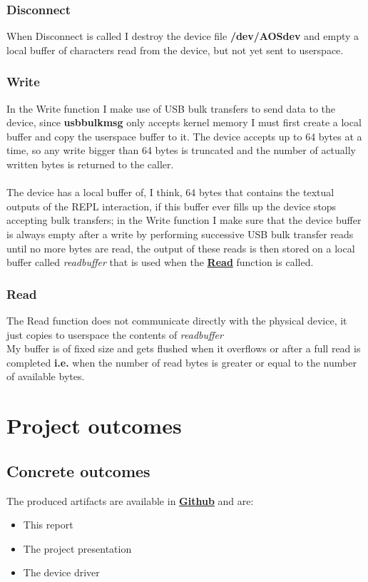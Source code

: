 \documentclass[10pt,a4]{article}
\begin{document}
\subsubsection{Disconnect}
When Disconnect is called I destroy the device file \textbf{/dev/AOSdev} and empty a local buffer of characters read from the device, but not yet sent to userspace.
\subsubsection{Write}
In the Write function I make use of USB bulk transfers to send data to the device, since \textbf{usb\textunderscore bulk\textunderscore msg} only accepts kernel memory I must first create a local buffer and copy the userspace buffer to it.
The device accepts up to 64 bytes at a time, so any write bigger than 64 bytes is truncated and the number of actually written bytes is returned to the caller.\\\\
The device has a local buffer of, I think, 64 bytes that contains the textual outputs of the REPL interaction, if this buffer ever fills up the device stops accepting bulk transfers; in the Write function I make sure that the device buffer is always empty after a write by performing successive USB bulk transfer reads until no more bytes are read, the output of these reads is then stored on a local buffer called \textit{read\textunderscore buffer} that is used when the \hyperref[sec:read]{\textbf{Read}} function is called.
\subsubsection{Read}
\label{sec:read}
The Read function does not communicate directly with the physical device, it just copies to userspace the contents of \textit{read\textunderscore buffer}\\
My buffer is of fixed size and gets flushed when it overflows or after a full read is completed \textbf{i.e.} when the number of read bytes is greater or equal to the number of available bytes. 

\section{Project outcomes}

\subsection{Concrete outcomes}
The produced artifacts are available in \href{https://github.com/Samuele-LP/AOS}{\textbf{Github}} and are:
\begin{itemize}
	\item This report
	\item The project presentation
	\item The device driver
\end{itemize}
\end{document}
